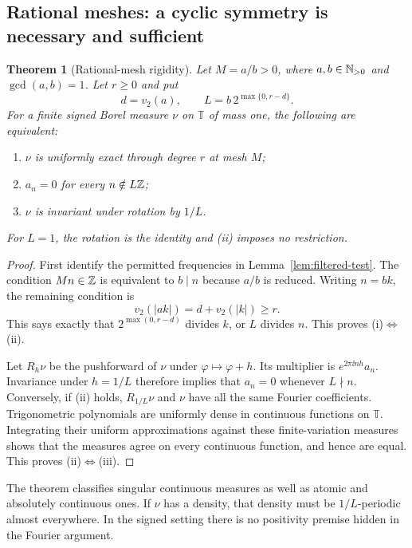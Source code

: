 \documentclass[11pt,a4paper]{article}
\numberwithin{equation}{section}
\newtheorem{theorem}{Theorem}[section]
\theoremstyle{definition}
\theoremstyle{remark}
\newcommand{\T}{\mathbb T}\newcommand{\C}{\mathbb C}
\begin{document}
\subsection{Rational meshes: a cyclic symmetry is necessary and sufficient}

\begin{theorem}[Rational-mesh rigidity]
\label{thm:classification}
Let $M=a/b>0$, where $a,b\in\mathbb N_{>0}$ and $\gcd(a,b)=1$.
Let $r\ge0$ and put
\begin{equation}
 d=v_2(a),\qquad L=b\,2^{\max\{0,r-d\}}.
 \label{eq:L}
\end{equation}
For a finite signed Borel measure $\nu$ on $\T$ of mass one, the following
are equivalent:
\begin{enumerate}[label=(\roman*),leftmargin=*,itemsep=1pt]
\item $\nu$ is uniformly exact through degree $r$ at mesh $M$;
\item $a_n=0$ for every $n\notin L\mathbb Z$;
\item $\nu$ is invariant under rotation by $1/L$.
\end{enumerate}
For $L=1$, the rotation is the identity and (ii) imposes no restriction.
\end{theorem}

\begin{proof}
First identify the permitted frequencies in Lemma~\ref{lem:filtered-test}.
The condition $Mn\in\mathbb Z$ is equivalent to $b\mid n$ because $a/b$ is
reduced. Writing $n=bk$, the remaining condition is
\[
 v_2(|ak|)=d+v_2(|k|)\ge r.
\]
This says exactly that $2^{\max(0,r-d)}$ divides $k$, or $L$ divides $n$.
This proves (i)$\Leftrightarrow$(ii).

Let $R_h\nu$ be the pushforward of $\nu$ under $\varphi\mapsto\varphi+h$.
Its multiplier is $e^{2\pi\ii nh}a_n$. Invariance under $h=1/L$
therefore implies that $a_n=0$ whenever $L\nmid n$.
Conversely, if (ii) holds, $R_{1/L}\nu$ and $\nu$ have all the same
Fourier coefficients. Trigonometric polynomials are uniformly dense in
continuous functions on $\T$. Integrating their uniform approximations
against these finite-variation measures shows that the measures agree
on every continuous function, and hence are equal. This proves
(ii)$\Leftrightarrow$(iii).
\end{proof}

The theorem classifies singular continuous measures as well as atomic and
absolutely continuous ones. If $\nu$ has a density, that density must be
$1/L$-periodic almost everywhere. In the signed setting there is no
positivity premise hidden in the Fourier argument.
\end{document}
